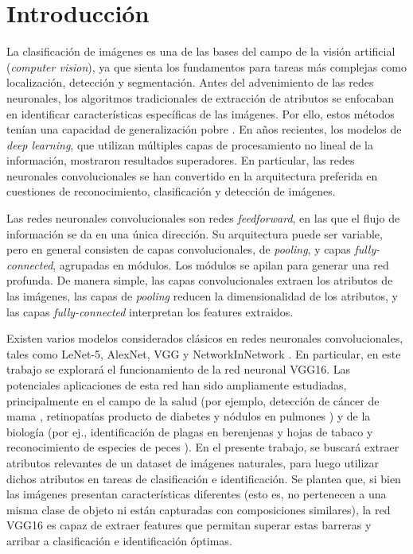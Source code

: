 \documentclass[journal,article,submit,pdftex,moreauthors]{Definitions/mdpi}
\begin{document}


\section{Introducción}

La clasificación de imágenes es una de las bases del campo de la visión artificial (\textit{computer vision}), ya que sienta los fundamentos para tareas más complejas como localización, detección y segmentación. Antes del advenimiento de las redes neuronales, los algoritmos tradicionales de extracción de atributos se enfocaban en identificar características específicas de las imágenes. Por ello, estos métodos tenían una capacidad de generalización pobre \cite{ref-rev1}. En años recientes, los modelos de \textit{deep learning}, que utilizan múltiples capas de procesamiento no lineal de la información, mostraron resultados superadores. En particular, las redes neuronales convolucionales se han convertido en la arquitectura preferida en cuestiones de reconocimiento, clasificación y detección de imágenes.

Las redes neuronales convolucionales son redes \textit{feedforward}, en las que el flujo de información se da en una única dirección. Su arquitectura puede ser variable, pero en general consisten de capas convolucionales, de \textit{pooling}, y capas \textit{fully-connected}, agrupadas en módulos. Los módulos se apilan para generar una red profunda. De manera simple, las capas convolucionales extraen los atributos de las imágenes, las capas de \textit{pooling} reducen la dimensionalidad de los atributos, y las capas \textit{fully-connected} interpretan los features extraidos. 

Existen varios modelos considerados clásicos en redes neuronales convolucionales, tales como LeNet-5, AlexNet, VGG y NetworkInNetwork \cite{ref-rev2}. En particular, en este trabajo se explorará el funcionamiento de la red neuronal VGG16. Las potenciales aplicaciones de esta red han sido ampliamente estudiadas, principalmente en el campo de la salud (por ejemplo, detección de cáncer de mama \cite{ref-cancer}, retinopatías producto de diabetes \cite{ref-retino} y nódulos en pulmones \cite{ref-pulmones}) y de la biología (por ej., identificación de plagas en berenjenas \cite{ref-berenjenas} y hojas de tabaco \cite{ref-tabaco} y reconocimiento de especies de peces \cite{ref-peces}). En el presente trabajo, se buscará extraer atributos relevantes de un dataset de imágenes naturales, para luego utilizar dichos atributos en tareas de clasificación e identificación. Se plantea que, si bien las imágenes presentan características diferentes (esto es, no pertenecen a una misma clase de objeto ni están capturadas con composiciones similares), la red VGG16 es capaz de extraer features que permitan superar estas barreras y arribar a clasificación e identificación óptimas.
\end{document}
